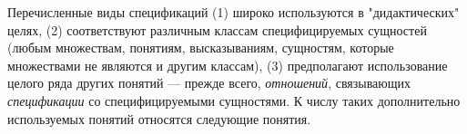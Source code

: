 Перечисленные виды спецификаций (1) широко используются в "дидактических"{} целях, (2) соответствуют различным классам специфицируемых сущностей (любым множествам, понятиям, высказываниям, сущностям, которые множествами не являются и другим классам), (3) предполагают использование целого ряда других понятий --- прежде всего, \textit{отношений}, связывающих \textit{спецификации} со специфицируемыми сущностями. К числу таких дополнительно используемых понятий относятся следующие понятия.

\begin{SCn}
\end{SCn}

\vspace{-\baselineskip}

\begin{SCn}
\end{SCn}

\vspace{-\baselineskip}

\begin{SCn}
\end{SCn}

\vspace{-\baselineskip}

\begin{SCn}
\end{SCn}

\vspace{-\baselineskip}

\begin{SCn}
\end{SCn}

\vspace{-\baselineskip}

\begin{SCn}
\end{SCn}

\vspace{-\baselineskip}

